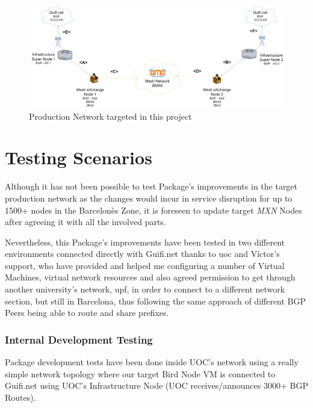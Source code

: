\begin{landscape}

\begin{figure}[ht!]
    \centering
    \includegraphics[width=\hsize]{images/targetnet}
    \caption{Production Network targeted in this project}
    \label{fig:tarnet}
\end{figure}
\end{landscape}
\newpage

\section{Testing Scenarios}
Although it has not been possible to test Package's improvements in the target production network as the changes would incur in service disruption for up to 1500+ nodes in the Barcelon\`{e}s Zone, it is foreseen to update target \textit{MXN} Nodes after agreeing it with all the involved parts.

Nevertheless, this Package's improvements have been tested in two different environments connected directly with Guifi.net thanks to \acrlong{uoc} and V\'{i}ctor's support, who have provided and helped me configuring a number of Virtual Machines, virtual network resources and also agreed permission to get through another university's network, \acrlong{upf}, in order to connect to a different network section, but still in Barcelona, thus following the same approach of different BGP Peers being able to route and share prefixes. 

\subsubsection{Internal Development Testing}
\label{sub:sub:idt}
Package development tests have been done inside UOC's network using a really simple network topology where our target Bird Node VM is connected to Guifi.net using UOC's Infrastructure Node (UOC receives/announces 3000+ BGP Routes). 

